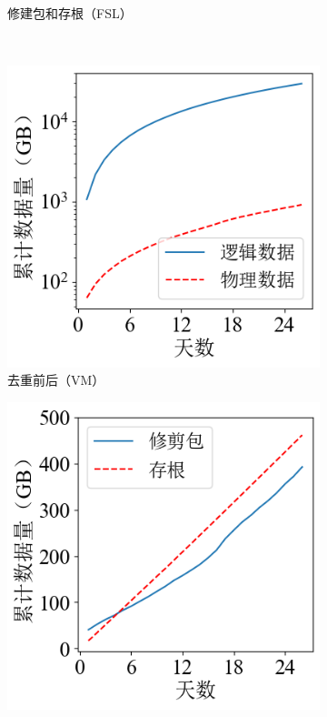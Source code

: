 \documentclass[promaster]{thesis-uestc}
\begin{document}
\begin{figure}
\begin{subfigure}{0.40\textwidth}
        \centering
        \captionsetup{width=\textwidth}
        \caption{修建包和存根（FSL）}
        \label{存储开销2}
    \end{subfigure}\\
    \begin{subfigure}{0.40\textwidth}
        \includegraphics[width=1\linewidth]{pic/ms_overhead.png}
        \centering
        \captionsetup{width=\textwidth}
        \caption{去重前后（VM）}
        \label{存储开销3}
    \end{subfigure}
    \begin{subfigure}{0.40\textwidth}
        \includegraphics[width=1\linewidth]{pic/ms_phy_stub.png}

\end{subfigure}
\end{figure}
\end{document}
